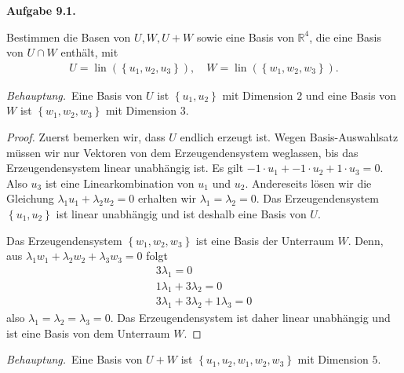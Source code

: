 \documentclass[12pt]{extarticle}
\newcommand{\mg}[1]{\mathbb{#1}}
\newcommand{\lin}{\operatorname{lin}}
\newcommand{\aufgn}[1]{\textbf{Aufgabe #1.}}
\newcommand{\beh}{\textit{Behauptung.}\ }
\begin{document}
\aufgn{9.1}

Bestimmen die Basen von \(U, W, U+W\) sowie eine Basis von \(\mg{R}^4\),
die eine Basis von \(U \cap W\) enthält, mit
\begin{align*}
  U=
  \lin \left( \left\{
    u_1, u_2, u_3
  \right\} \right), \quad
    W=
  \lin \left( \left\{
    w_1, w_2, w_3
   \right\} \right).
\end{align*}

\beh Eine Basis von \(U\) ist \(\left\{ u_1, u_2 \right\}\) mit Dimension
\(2\) und eine Basis von \(W\) ist \(\left\{ w_1, w_2, w_3 \right\}\) mit
Dimension \(3\).

\begin{proof}
  Zuerst bemerken wir, dass \(U\) endlich erzeugt ist.  Wegen
  Basis-Auswahlsatz müssen wir nur Vektoren von dem Erzeugendensystem
  weglassen, bis das Erzeugendensystem linear unabhängig ist.  Es gilt
  \(-1 \cdot u_1 + -1 \cdot u_2 + 1 \cdot u_3 = 0\).  Also \(u_3\) ist
  eine Linearkombination von \(u_1\) und \(u_2\).  Andereseits lösen wir
  die Gleichung \(\lambda_1 u_1 + \lambda_2 u_2 = 0\) erhalten wir
  \(\lambda_1 = \lambda_2 = 0\).  Das Erzeugendensystem
  \(\left\{ u_1, u_2 \right\}\) ist linear unabhängig und ist deshalb
  eine Basis von \(U\).

Das Erzeugendensystem \(\left\{ w_1, w_2, w_3 \right\}\) ist eine Basis
der Unterraum \(W\).  Denn, aus $\lambda_1 w_1 + \lambda_2w_2 +
\lambda_3w_3=0$ folgt
\begin{align*}
  3 \lambda_1 = 0 \\
  1 \lambda_1 + 3 \lambda_2 = 0 \\
  3 \lambda_1 + 3 \lambda_2 + 1 \lambda_3 = 0
\end{align*}
also \(\lambda_1 = \lambda_2 = \lambda_3 = 0\).  Das Erzeugendensystem
ist daher linear unabhängig und ist eine Basis von dem Unterraum \(W\).
\end{proof}

\beh Eine Basis von \(U + W\) ist $\left\{ u_1, u_2, w_1, w_2, w_3
\right\}$ mit Dimension \(5\).
\end{document}
